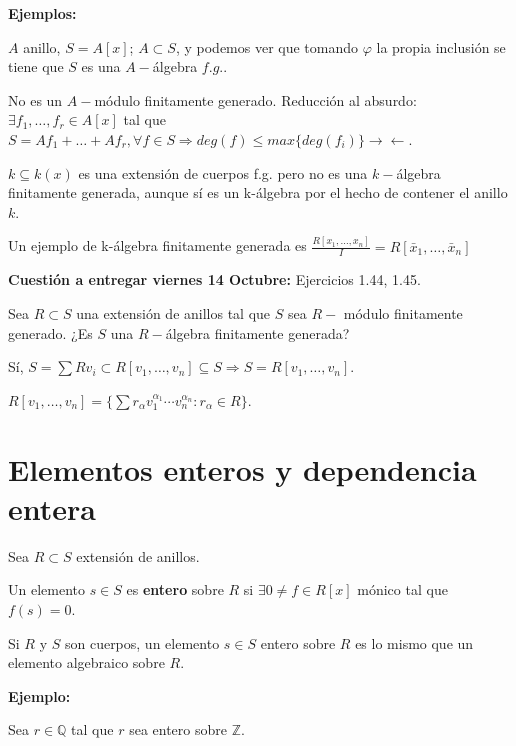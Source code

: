 \textbf{Ejemplos: }

\begin{itemize*}
\item $A$ anillo, $S=A[x]$; $A\subset S$, y podemos ver que tomando $\varphi$ la propia inclusión se tiene que $S$ es una $A-$álgebra $f.g.$.

No es un $A-$módulo finitamente generado. Reducción al absurdo: $\exists f_1,\dots, f_r\in A[x]$ tal que $S=Af_1+\dots+Af_r, \forall f\in S\Rightarrow deg(f)\le max\{deg(f_i)\} \rightarrow \leftarrow$.

\item $k\subseteq k(x)$ es una extensión de cuerpos f.g. pero no es una $k-$álgebra finitamente generada, aunque sí es un k-álgebra por el hecho de contener el anillo $k$.

\item Un ejemplo de k-álgebra finitamente generada es $\frac{R[x_1,\dots,x_n]}{I}=R[\bar{x}_1,\dots,\bar{x}_n]$
\end{itemize*}

\textbf{Cuestión a entregar viernes 14 Octubre:} Ejercicios 1.44, 1.45.


Sea $R\subset S$ una extensión de anillos tal que $S$ sea $R-$ módulo finitamente generado. ¿Es $S$ una $R-$álgebra finitamente generada?

Sí, $S=\sum Rv_i \subset R[v_1,\dots,v_n]\subseteq S \Rightarrow S=R[v_1,\dots, v_n]$.

$R[v_1,\dots,v_n]= \{\sum r_\alpha v_1^{\alpha_1}\cdots v_n^{\alpha_n}: r_\alpha \in R\}$.

\section{Elementos enteros y dependencia entera}

Sea $R\subset S$ extensión de anillos.

\begin{Def}
Un elemento $s\in S$ es \textbf{entero} sobre $R$ si $\exists 0\neq f\in R[x]$ mónico tal que $f(s)=0$.
\end{Def}

\begin{nota}
Si $R$ y $S$ son cuerpos, un elemento $s\in S$ entero sobre $R$ es lo mismo que un elemento algebraico sobre $R$.
\end{nota}

\textbf{Ejemplo: }

Sea $r\in \mathbb{Q}$ tal que $r$ sea entero sobre $\mathbb{Z}$.

